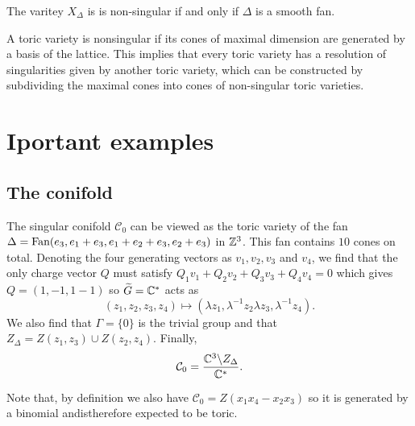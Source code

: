         \begin{prop*}
            The varitey $X_\Delta$ is is non-singular if and only if $\Delta$ is a smooth fan.
        \end{prop*}


        A toric variety is nonsingular if its cones of maximal dimension are generated by a basis of the lattice. This implies that every toric variety has a resolution of singularities given by another toric variety, which can be constructed by subdividing the maximal cones into cones of non-singular toric varieties.

\section{Iportant examples}
    
    \subsection{The conifold}

        The singular conifold $\mathcal{C}_0$ can be viewed as the toric variety of the fan $\Delta=\text{Fan}(e_3,e_1+e_3,e_1+e_2+e_3,e_2+e_3)$ in $\mathbb{Z}^3$. This fan contains $10$ cones on total. Denoting the four generating vectors as $v_1,v_2,v_3$ and $v_4$, we find that the only charge vector $Q$ must satisfy $Q_1v_1+Q_2v_2+Q_3v_3+Q_4v_4=0$ which gives $Q=(1,-1,1-1)$ so $\widetilde{G}=\mathbb{C}^*$ acts as
        \begin{equation}
            (z_1,z_2,z_3,z_4)\mapsto (\lambda z_1,\lambda^{-1} z_2\lambda z_3,\lambda^{-1} z_4).
        \end{equation}
        We also find that $\Gamma=\{0\}$ is the trivial group and that $Z_\Delta=Z(z_1,z_3)\cup Z(z_2,z_4)$. Finally,
        \begin{equation}
            \mathcal{C}_0=\frac{\mathbb{C}^3\backslash Z_\Delta}{\mathbb{C}^*}.
        \end{equation}

        Note that, by definition we also have $\mathcal{C}_0=Z(x_1x_4-x_2x_3)$ so it is generated by a binomial andistherefore expected to be toric. 

